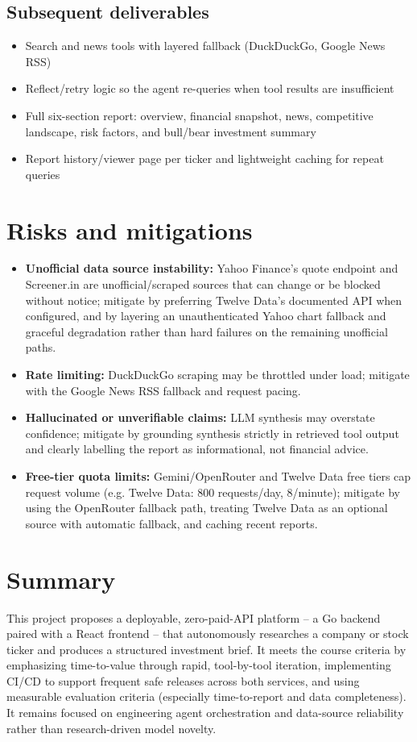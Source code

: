 \documentclass[11pt,a4paper]{article}
\begin{document}
\subsection{Subsequent deliverables}
\begin{itemize}[leftmargin=0.7cm]
    \item Search and news tools with layered fallback (DuckDuckGo, Google News RSS)
    \item Reflect/retry logic so the agent re-queries when tool results are insufficient
    \item Full six-section report: overview, financial snapshot, news, competitive landscape, risk factors, and bull/bear investment summary
    \item Report history/viewer page per ticker and lightweight caching for repeat queries
\end{itemize}

\section{Risks and mitigations}
\begin{itemize}[leftmargin=0.7cm]
    \item \textbf{Unofficial data source instability:} Yahoo Finance's quote endpoint and Screener.in are unofficial/scraped sources that can change or be blocked without notice; mitigate by preferring Twelve Data's documented API when configured, and by layering an unauthenticated Yahoo chart fallback and graceful degradation rather than hard failures on the remaining unofficial paths.
    \item \textbf{Rate limiting:} DuckDuckGo scraping may be throttled under load; mitigate with the Google News RSS fallback and request pacing.
    \item \textbf{Hallucinated or unverifiable claims:} LLM synthesis may overstate confidence; mitigate by grounding synthesis strictly in retrieved tool output and clearly labelling the report as informational, not financial advice.
    \item \textbf{Free-tier quota limits:} Gemini/OpenRouter and Twelve Data free tiers cap request volume (e.g. Twelve Data: 800 requests/day, 8/minute); mitigate by using the OpenRouter fallback path, treating Twelve Data as an optional source with automatic fallback, and caching recent reports.
\end{itemize}

\section{Summary}
This project proposes a deployable, zero-paid-API platform -- a Go backend paired with a React frontend -- that autonomously researches a company or stock ticker and produces a structured investment brief. It meets the course criteria by emphasizing time-to-value through rapid, tool-by-tool iteration, implementing CI/CD to support frequent safe releases across both services, and using measurable evaluation criteria (especially time-to-report and data completeness). It remains focused on engineering agent orchestration and data-source reliability rather than research-driven model novelty.
\end{document}
